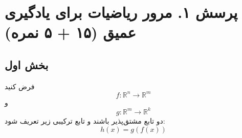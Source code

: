 \section*{پرسش ۱. مرور ریاضیات برای یادگیری عمیق (۱۵ + ۵ نمره)}

\subsection*{بخش اول}

فرض کنید
\begin{equation*}
    f: \mathbb{R}^n \to \mathbb{R}^m
\end{equation*}
و
\begin{equation*}
    g: \mathbb{R}^m \to \mathbb{R}^k
\end{equation*}
دو تابع مشتق‌پذیر باشند و تابع ترکیبی زیر تعریف شود:
\begin{equation*}
    h(x) = g(f(x))
\end{equation*}


